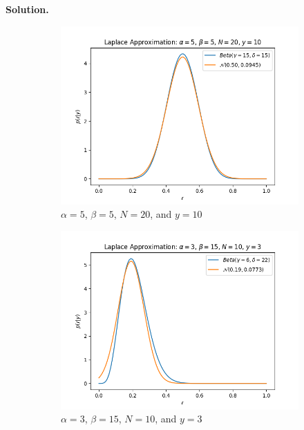 \documentclass[10pt]{article}
\begin{document}
\begin{itemize}
{\bf Solution.}
\begin{figure}[h!]
\centering
\begin{subfigure}[]{.32\textwidth}
  \centering
  \includegraphics[width=1\linewidth]{figures/laplace_case1.png}
  \caption{$\alpha = 5$, $\beta = 5$, $N = 20$, and $y = 10$}
  \label{fig:sub1}
\end{subfigure}
\begin{subfigure}{.32\textwidth}
  \centering
  \includegraphics[width=1\linewidth]{figures/laplace_case2.png}
  \caption{$\alpha = 3$, $\beta = 15$, $N = 10$, and $y = 3$}
  \label{fig:sub2}
\end{subfigure}
\begin{subfigure}{.32\textwidth}

\end{subfigure}
\end{figure}
\end{itemize}
\end{document}
